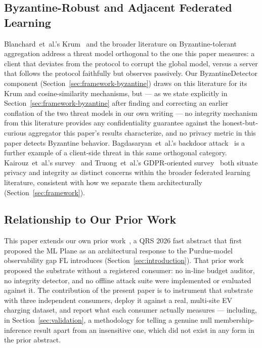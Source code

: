 \subsection{Byzantine-Robust and Adjacent Federated Learning}
\label{sec:related-byzantine}

Blanchard~et~al.'s Krum~\cite{blanchard2017machine} and the broader
literature on Byzantine-tolerant aggregation address a threat model
orthogonal to the one this paper measures: a client that deviates from
the protocol to corrupt the global model, versus a server that follows
the protocol faithfully but observes passively. Our ByzantineDetector
component (Section~\ref{sec:framework-byzantine}) draws on this
literature for its Krum and cosine-similarity mechanisms, but --- as
we state explicitly in Section~\ref{sec:framework-byzantine} after
finding and correcting an earlier conflation of the two threat models
in our own writing --- no integrity mechanism from this literature
provides any confidentiality guarantee against the honest-but-curious
aggregator this paper's results characterize, and no privacy metric in
this paper detects Byzantine behavior. Bagdasaryan~et~al.'s backdoor
attack~\cite{bagdasaryan2020backdoor} is a further example of a
client-side threat in this same orthogonal category. Kairouz~et~al.'s
survey~\cite{kairouz2021advances} and Truong~et~al.'s GDPR-oriented
survey~\cite{truong2021privacy} both situate privacy and integrity as
distinct concerns within the broader federated learning literature,
consistent with how we separate them architecturally
(Section~\ref{sec:framework}).

\subsection{Relationship to Our Prior Work}
\label{sec:related-prior}

This paper extends our own prior work~\cite{imperatrice2026toward}, a
QRS 2026 fast abstract that first proposed the ML Plane as an
architectural response to the Purdue-model observability gap FL
introduces (Section~\ref{sec:introduction}). That prior work proposed
the substrate without a registered consumer: no in-line budget
auditor, no integrity detector, and no offline attack suite were
implemented or evaluated against it. The contribution of the present
paper is to instrument that substrate with three independent
consumers, deploy it against a real, multi-site EV charging dataset,
and report what each consumer actually measures --- including, in
Section~\ref{sec:validation}, a methodology for telling a genuine null
membership-inference result apart from an insensitive one, which did
not exist in any form in the prior abstract.
